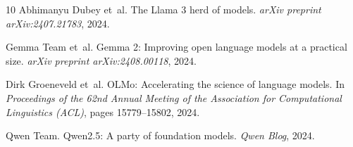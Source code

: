 \documentclass[11pt,a4paper]{article}
\begin{document}
\begin{thebibliography}{10}
Abhimanyu Dubey et~al.
\newblock The Llama 3 herd of models.
\newblock \emph{arXiv preprint arXiv:2407.21783}, 2024.

Gemma Team et~al.
\newblock Gemma 2: Improving open language models at a practical size.
\newblock \emph{arXiv preprint arXiv:2408.00118}, 2024.

Dirk Groeneveld et~al.
\newblock OLMo: Accelerating the science of language models.
\newblock In \emph{Proceedings of the 62nd Annual Meeting of the Association for Computational Linguistics (ACL)}, pages 15779--15802, 2024.

Qwen Team.
\newblock Qwen2.5: A party of foundation models.
\newblock \emph{Qwen Blog}, 2024.

\end{thebibliography}
\end{document}
